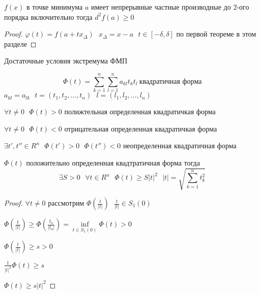 \begin{theorem}
  $f(x)$ в точке минимума $a$ имеет непрерывные частные производные до 2-ого
  порядка включительно тогда $d^2f(a) \ge 0$
\end{theorem}

\begin{proof}
  $\varphi(t) = f(a + tx_{\Delta}) ~~~ x_{\Delta} = x - a ~~~
  t \in [-\delta, \delta]$ по первой теореме в этом разделе
\end{proof}

\begin{title}[\Large]
  Достаточные условия экстремума ФМП
\end{title}

\begin{define}
  $$
  \Phi(t) = \sum_{k=1}^n \sum_{l=1}^n a_{kl}t_k t_l ~
  \text{квадратичная форма}
  $$
  $a_{kl} = a_{lk} ~~~ t = (t_1, t_2, \ldots, t_n) ~~~
  l = (l_1, l_2, \ldots, l_n)$

  $\forall t \not= 0 ~~~ \Phi(t) > 0$ полижтельная определенная квадратичкая
  форма

  $\forall t \not= 0 ~~~ \Phi(t) < 0$ отрицательная определенная квадратичкая
  форма

  $\exists t', t'' \in R^n ~~~ \Phi(t') > 0 ~~~ \Phi(t'') < 0$ неопределенная
  квадратичная форма
\end{define}

\begin{theorem}
  $\Phi(t)$ положительно определенная квадтратичная форма тогда
  $$
  \exists S > 0 ~~~ \forall t \in R^n ~~~ \Phi(t) \ge S|t|^2 ~~~
  |t| = \sqrt{\sum_{k=1}^n t_k^2}
  $$
\end{theorem}

\begin{proof}
  $\forall t \not= 0$ рассмотрим $\Phi(\frac{t}{|t|}) ~~~ \frac{t}{|t|} \in
  S_1(0)$

  $\Phi(\frac{t}{|t|}) \ge \Phi(\frac{t_0}{|t_0|}) =
  \inf \limits_{t \in S_1(0)} \Phi(t) > 0$

  $\Phi(\frac{t}{|t|}) \ge s > 0$

  $\frac{1}{|t|^2} \Phi(t) \ge s$

  $\Phi(t) \ge s|t|^2$
\end{proof}

